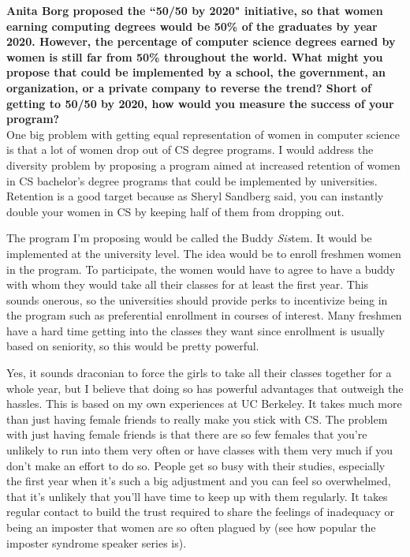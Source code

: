 \documentclass{article}
\begin{document}
	
\pagestyle{plain}

\textbf{Anita Borg proposed the ``50/50 by 2020" initiative, so that women earning computing degrees would be 50\% of the graduates by year 2020. However, the percentage of computer science degrees earned by women is still far from 50\% throughout the world.  What might you propose that could be implemented by a school, the government, an organization, or a private company to reverse the trend? Short of getting to 50/50 by 2020, how would you measure the success of your program?}\\

One big problem with getting equal representation of women in computer science is that a lot of women drop out of CS degree programs.  %
I would address the diversity problem by proposing a program aimed at increased retention of women in CS bachelor's degree programs that could be implemented by universities.
Retention is a good target because as Sheryl Sandberg said, you can instantly double your women in CS by keeping half of them from dropping out.  %

The program I'm proposing would be called the Buddy \textit{Sis}tem.
It would be implemented at the university level.
The idea would be to enroll freshmen women in the program.
To participate, the women would have to agree to have a buddy with whom they would take all their classes for at least the first year.
This sounds onerous, so the universities should provide perks to incentivize being in the program such as preferential enrollment in courses of interest.
Many freshmen have a hard time getting into the classes they want since enrollment is usually based on seniority, so this would be pretty powerful.

Yes, it sounds draconian to force the girls to take all their classes together for a whole year, but I believe that doing so has powerful advantages that outweigh the hassles.
This is based on my own experiences at UC Berkeley.
It takes much more than just having female friends to really make you stick with CS.
The problem with just having female friends is that there are so few females that you're unlikely to run into them very often or have classes with them very much if you don't make an effort to do so.
People get so busy with their studies, especially the first year when it's such a big adjustment and you can feel so overwhelmed, that it's unlikely that you'll have time to keep up with them regularly.
It takes regular contact to build the trust required to share the feelings of inadequacy or being an imposter that women are so often plagued by (see how popular the imposter syndrome speaker series is).
\end{document}
